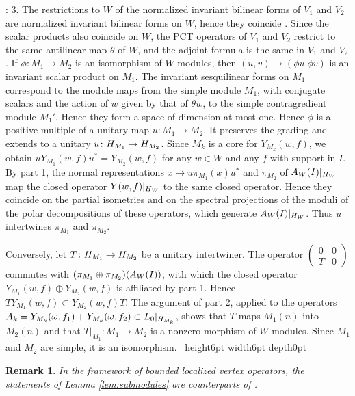 \documentclass[leqno]{article}
\let\cal\relax
\newcommand{\cal}{\mathcal}
\newcommand{\qed}{\hfill \vrule height6pt  width6pt depth0pt}
\newcommand{\co}{\colon}
\newcommand{\ovl}{\overline}
\newtheorem{remark}[thm]{Remark}
\newenvironment{proof}[1][]{\noindent {\it Proof #1} : }{\hbox{~}\qed
\smallskip
}
\numberwithin{equation}{section}
\begin{document}
\begin{proof}
3. The restrictions to $W$ of the normalized invariant bilinear forms of $V_1$ and $V_2$ are normalized invariant bilinear forms on $W$, hence they coincide \cite{Li94}. Since the scalar products also coincide on $W$, the PCT operators of $V_1$ and $V_2$ restrict to the same antilinear map $\theta$ of $W$, and the adjoint formula \cite[(95) p.~43]{CKLW18} is the same in $V_1$ and $V_2$. If $\phi \co M_1 \to M_2$ is an isomorphism of $W$-modules, then $(u,v) \mapsto (\phi u|\phi v)$ is an invariant scalar product on $M_1$. The invariant sesquilinear forms on $M_1$ correspond to the module maps from the simple module $\ovl{M_1}$, with conjugate scalars and the action of $w$ given by that of $\theta w$, to the simple contragredient module $M_1'$. Hence they form a space of dimension at most one. Hence $\phi$ is a positive multiple of a unitary map $u \co M_1 \to M_2$. It preserves the grading and extends to a unitary $u \co \cal H_{M_1} \to \cal H_{M_2}$. Since $M_k$ is a core for $Y_{M_k}(w,f)$, we obtain $uY_{M_1}(w,f)u^* = Y_{M_2}(w,f)$ for any $w \in W$ and any $f$ with support in $I$. By part 1, the normal representations $x \mapsto u\pi_{M_1}(x)u^*$ and $\pi_{M_2}$ of $\cal A_W(I)|_{\cal H_W}$ map the closed operator $Y(w,f)|_{\cal H_W}$ to the same closed operator. Hence they coincide on the partial isometries and on the spectral projections of the moduli of the polar decompositions of these operators, which generate $\cal A_W(I)|_{\cal H_W}$. Thus $u$ intertwines $\pi_{M_1}$ and $\pi_{M_2}$.

Conversely, let $T \co \cal H_{M_1} \to \cal H_{M_2}$ be a unitary intertwiner. The operator $\left(\begin{smallmatrix} 0 & 0 \\ T & 0\end{smallmatrix}\right)$ commutes with $(\pi_{M_1} \oplus \pi_{M_2})(\cal A_W(I))$, with which the closed operator $Y_{M_1}(w,f) \oplus Y_{M_2}(w,f)$ is affiliated by part 1. Hence $TY_{M_1}(w,f) \subset Y_{M_2}(w,f)T$. The argument of part 2, applied to the operators $A_k = Y_{M_k}(\omega,f_1)+Y_{M_k}(\omega,f_2) \subset L_0|_{\cal H_{M_k}}$, shows that $T$ maps $M_1(n)$ into $M_2(n)$ and that $T|_{M_1} \co M_1 \to M_2$ is a nonzero morphism of $W$-modules. Since $M_1$ and $M_2$ are simple, it is an isomorphism.
\end{proof}

\begin{remark}\normalfont
In the framework of bounded localized vertex operators, the statements of Lemma \ref{lem:submodules} are counterparts of \cite[Proposition 5.4 p.~50, Proposition 5.5 p.~51 and Theorem 5.6 p.~52]{Ten19a}.
\end{remark}
\end{document}

